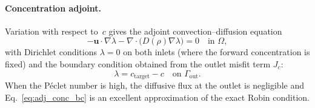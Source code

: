 \paragraph{Concentration adjoint.}
Variation with respect to~\(c\) gives the adjoint convection--diffusion equation
\begin{equation}
    -\mathbf{u}\cdot\nabla\lambda - \nabla\cdot\bigl(D(\rho)\nabla\lambda\bigr) = 0 \quad\text{in } \Omega,
    \label{eq:adj_conc}
\end{equation}
with Dirichlet conditions \(\lambda = 0\) on both inlets (where the forward concentration is fixed) and the boundary condition obtained from the outlet misfit term \(J_c\):
\begin{equation}
    \lambda = c_{\text{target}} - c \quad\text{on } \Gamma_{\text{out}}.
    \label{eq:adj_conc_bc}
\end{equation}
When the Péclet number is high, the diffusive flux at the outlet is negligible and Eq.~\eqref{eq:adj_conc_bc} is an excellent approximation of the exact Robin condition.

